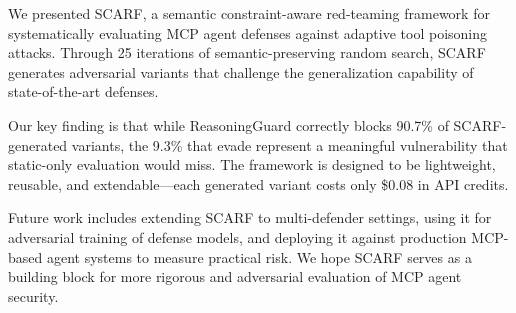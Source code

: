 We presented SCARF, a semantic constraint-aware red-teaming framework for systematically evaluating MCP agent defenses against adaptive tool poisoning attacks.
Through 25 iterations of semantic-preserving random search, SCARF generates adversarial variants that challenge the generalization capability of state-of-the-art defenses.

Our key finding is that while ReasoningGuard correctly blocks 90.7\% of SCARF-generated variants, the 9.3\% that evade represent a meaningful vulnerability that static-only evaluation would miss.
The framework is designed to be lightweight, reusable, and extendable---each generated variant costs only \$0.08 in API credits.

Future work includes extending SCARF to multi-defender settings, using it for adversarial training of defense models, and deploying it against production MCP-based agent systems to measure practical risk.
We hope SCARF serves as a building block for more rigorous and adversarial evaluation of MCP agent security.